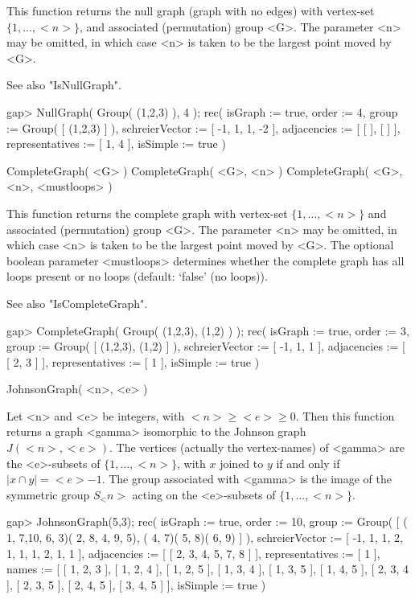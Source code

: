 This function returns the null graph (graph with no edges) with vertex-set
$\{1,\ldots,<n>\}$, and associated (permutation) group <G>. The parameter
<n> may be omitted, in which case <n> is taken to be the largest point
moved by <G>.

See also "IsNullGraph".

\beginexample
gap> NullGraph( Group( (1,2,3) ), 4 );
rec(
  isGraph := true,
  order := 4,
  group := Group( [ (1,2,3) ] ),
  schreierVector := [ -1, 1, 1, -2 ],
  adjacencies := [ [  ], [  ] ],
  representatives := [ 1, 4 ],
  isSimple := true )
\endexample


\>CompleteGraph( <G> )
\>CompleteGraph( <G>, <n> )
\>CompleteGraph( <G>, <n>, <mustloops> )

This function returns the complete graph with vertex-set
$\{1,\ldots,<n>\}$ and associated (permutation) group <G>. The parameter
<n> may be  omitted, in which case <n> is taken to be the largest point
moved by <G>.  The optional boolean parameter <mustloops> determines
whether the complete graph has all loops present or no loops (default:
`false' (no loops)).

See also "IsCompleteGraph".

\beginexample
gap> CompleteGraph( Group( (1,2,3), (1,2) ) );
rec(
  isGraph := true,
  order := 3,
  group := Group( [ (1,2,3), (1,2) ] ),
  schreierVector := [ -1, 1, 1 ],
  adjacencies := [ [ 2, 3 ] ],
  representatives := [ 1 ],
  isSimple := true )
\endexample


\>JohnsonGraph( <n>, <e> )

Let <n> and <e> be integers, with $<n>\ge <e>\ge 0$.  Then this function
returns a graph <gamma> isomorphic to the Johnson graph $J(<n>,<e>)$.
The vertices (actually the vertex-names) of <gamma> are the <e>-subsets
of $\{1,\ldots, <n>\}$, with $x$ joined to $y$ if and only if $|x \cap y|
= <e>-1$.  The group associated with <gamma> is the image of the symmetric
group $S_<n>$ acting on the <e>-subsets of $\{1,\ldots,<n>\}$.

\beginexample
gap> JohnsonGraph(5,3);
rec(
  isGraph := true,
  order := 10,
  group := Group( [ ( 1, 7,10, 6, 3)( 2, 8, 4, 9, 5), ( 4, 7)( 5, 8)( 6, 9)
     ] ),
  schreierVector := [ -1, 1, 1, 2, 1, 1, 1, 2, 1, 1 ],
  adjacencies := [ [ 2, 3, 4, 5, 7, 8 ] ],
  representatives := [ 1 ],
  names := [ [ 1, 2, 3 ], [ 1, 2, 4 ], [ 1, 2, 5 ], [ 1, 3, 4 ], [ 1, 3, 5 ],
      [ 1, 4, 5 ], [ 2, 3, 4 ], [ 2, 3, 5 ], [ 2, 4, 5 ], [ 3, 4, 5 ] ],
  isSimple := true )
\endexample

